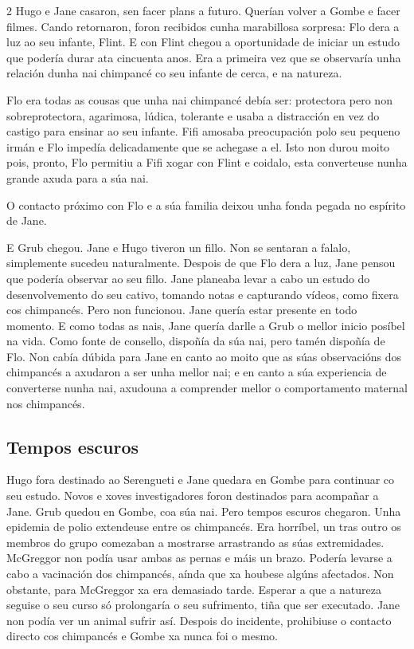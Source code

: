 \begin{multicols}{2}
Hugo e Jane casaron, sen facer plans a futuro. Querían volver a Gombe e facer
filmes. Cando retornaron, foron recibidos cunha marabillosa sorpresa: Flo dera
a luz ao seu infante, Flint. E con Flint chegou a oportunidade de iniciar un
estudo que podería durar ata cincuenta anos. Era a primeira vez que se
observaría unha relación dunha nai chimpancé co seu infante de cerca, e na
natureza.

Flo era todas as cousas que unha nai chimpancé debía ser: protectora pero non
sobreprotectora, agarimosa, lúdica, tolerante e usaba a distracción en vez do
castigo para ensinar ao seu infante. Fifi amosaba preocupación polo seu pequeno
irmán e Flo impedía delicadamente que se achegase a el. Isto non durou moito
pois, pronto, Flo permitiu a Fifi xogar con Flint e coidalo, esta
converteuse nunha grande axuda para a súa nai.

O contacto próximo con Flo e a súa familia deixou unha fonda pegada no espírito
de Jane.

E Grub chegou. Jane e Hugo tiveron un fillo. Non se sentaran a falalo,
simplemente sucedeu naturalmente. Despois de que Flo dera a luz, Jane pensou
que podería observar ao seu fillo. Jane planeaba levar a cabo un estudo do
desenvolvemento do seu cativo, tomando notas e capturando vídeos, como fixera
cos chimpancés. Pero non funcionou. Jane quería estar presente en todo momento.
E como todas as nais, Jane quería darlle a Grub o mellor inicio posíbel na
vida. Como fonte de consello, dispoñía da súa nai, pero tamén dispoñía de Flo.
Non cabía dúbida para Jane en canto ao moito que as súas observacións dos
chimpancés a axudaron a ser unha mellor nai; e en canto a súa experiencia de
converterse nunha nai, axudouna a comprender mellor o comportamento maternal
nos chimpancés.


\subsection*{Tempos escuros}

Hugo fora destinado ao Serengueti e Jane quedara en Gombe para continuar co seu
estudo. Novos e xoves investigadores foron destinados para acompañar a Jane.
Grub quedou en Gombe, coa súa nai. Pero tempos escuros chegaron. Unha epidemia
de polio extendeuse entre os chimpancés. Era horríbel, un tras outro os membros
do grupo comezaban a mostrarse arrastrando as súas extremidades. McGreggor non
podía usar ambas as pernas e máis un brazo. Podería levarse a cabo a vacinación
dos chimpancés, aínda que xa houbese algúns afectados. Non obstante, para
McGreggor xa era demasiado tarde. Esperar a que a natureza seguise o seu curso
só prolongaría o seu sufrimento, tiña que ser executado. Jane non podía ver un
animal sufrir así. Despois do incidente, prohibiuse o contacto directo cos
chimpancés e Gombe xa nunca foi o mesmo.


\end{multicols}
